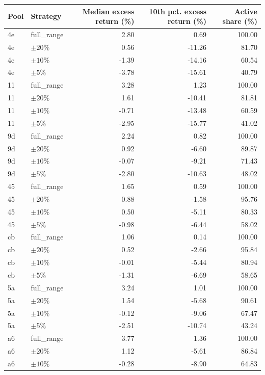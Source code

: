 \documentclass[anonymous]{lipics-v2021}
\begin{document}
{\begin{table}[t]
\centering
\scriptsize
\setlength{\tabcolsep}{5pt}
\begin{tabular}{llrrr}
\toprule
Pool & Strategy & Median excess return (\%) & 10th pct. excess return (\%) & Active share (\%) \\
\midrule
4e & full\_range & 2.80 & 0.69 & 100.00 \\
4e & $\pm 20\%$ & 0.56 & -11.26 & 81.70 \\
4e & $\pm 10\%$ & -1.39 & -14.16 & 60.54 \\
4e & $\pm 5\%$  & -3.78 & -15.61 & 40.79 \\
\midrule
11 & full\_range & 3.28 & 1.23 & 100.00 \\
11 & $\pm 20\%$ & 1.61 & -10.41 & 81.81 \\
11 & $\pm 10\%$ & -0.71 & -13.48 & 60.59 \\
11 & $\pm 5\%$  & -2.95 & -15.77 & 41.02 \\
\midrule
9d & full\_range & 2.24 & 0.82 & 100.00 \\
9d & $\pm 20\%$ & 0.92 & -6.60 & 89.87 \\
9d & $\pm 10\%$ & -0.07 & -9.21 & 71.43 \\
9d & $\pm 5\%$  & -2.80 & -10.63 & 48.02 \\
\midrule
45 & full\_range & 1.65 & 0.59 & 100.00 \\
45 & $\pm 20\%$ & 0.88 & -1.58 & 95.76 \\
45 & $\pm 10\%$ & 0.50 & -5.11 & 80.33 \\
45 & $\pm 5\%$  & -0.98 & -6.44 & 58.02 \\
\midrule
cb & full\_range & 1.06 & 0.14 & 100.00 \\
cb & $\pm 20\%$ & 0.52 & -2.66 & 95.84 \\
cb & $\pm 10\%$ & -0.01 & -5.44 & 80.94 \\
cb & $\pm 5\%$  & -1.31 & -6.69 & 58.65 \\
\midrule
5a & full\_range & 3.24 & 1.01 & 100.00 \\
5a & $\pm 20\%$ & 1.54 & -5.68 & 90.61 \\
5a & $\pm 10\%$ & -0.12 & -9.06 & 67.47 \\
5a & $\pm 5\%$  & -2.51 & -10.74 & 43.24 \\
\midrule
a6 & full\_range & 3.77 & 1.36 & 100.00 \\
a6 & $\pm 20\%$ & 1.12 & -5.61 & 86.84 \\
a6 & $\pm 10\%$ & -0.28 & -8.90 & 64.83 \\

\end{tabular}
\end{table}}
\end{document}
